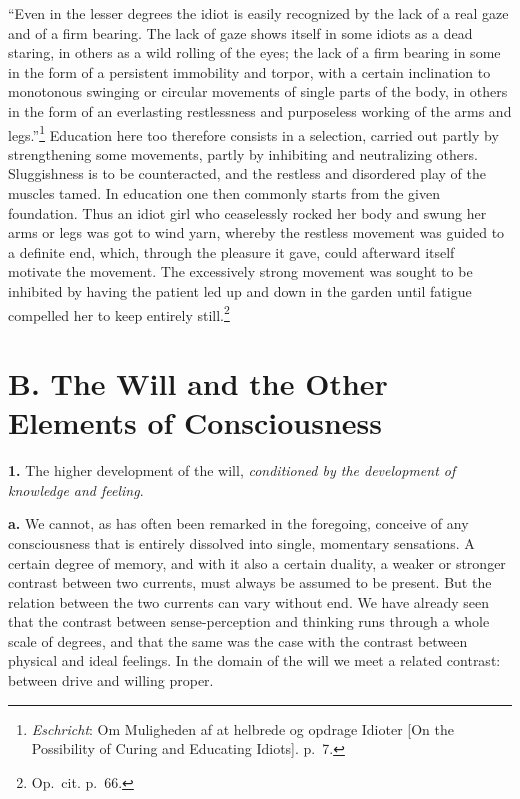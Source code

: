 \documentclass[12pt,a4paper]{book}
\newcommand{\opage}[1]{\marginnote{\footnotesize\textit{[#1]}}}
\begin{document}
``Even in the lesser degrees the idiot is easily recognized by the lack
of a real gaze and of a firm bearing. The
\opage{379}lack of gaze shows itself in some idiots as a dead staring, in
others as a wild rolling of the eyes; the lack of a firm bearing in some
in the form of a persistent immobility and torpor, with a certain
inclination to monotonous swinging or circular movements of single parts
of the body, in others in the form of an everlasting restlessness and
purposeless working of the arms and legs.''\footnote{\emph{Eschricht}: Om
Muligheden af at helbrede og opdrage Idioter [On the Possibility of
Curing and Educating Idiots]. p.~7.} Education here too therefore
consists in a selection, carried out partly by strengthening some
movements, partly by inhibiting and neutralizing others. Sluggishness is
to be counteracted, and the restless and disordered play of the muscles
tamed. In education one then commonly starts from the given foundation.
Thus an idiot girl who ceaselessly rocked her body and swung her arms or
legs was got to wind yarn, whereby the restless movement was guided to a
definite end, which, through the pleasure it gave, could afterward itself
motivate the movement. The excessively strong movement was sought to be
inhibited by having the patient led up and down in the garden until
fatigue compelled her to keep entirely
still.\footnote{Op.\ cit. p.~66.}

\section*{B. The Will and the Other Elements of Consciousness}

\textbf{1.} The higher development of the will, \emph{conditioned by the
development of knowledge and feeling}.

\textbf{a.} We cannot, as has often been remarked in the foregoing,
conceive of any consciousness that is entirely dissolved into single,
momentary sensations. A certain degree of memory, and with it also a
certain duality, a weaker or stronger contrast between two currents, must
always be assumed to be present. But the relation between the two
currents can vary without end. We have already seen that the contrast
between sense-perception and thinking runs through a whole scale of
degrees, and that the same was the case with the contrast between
physical and ideal feelings. In the domain of the will we meet a related
contrast: between drive and willing proper.
\end{document}
